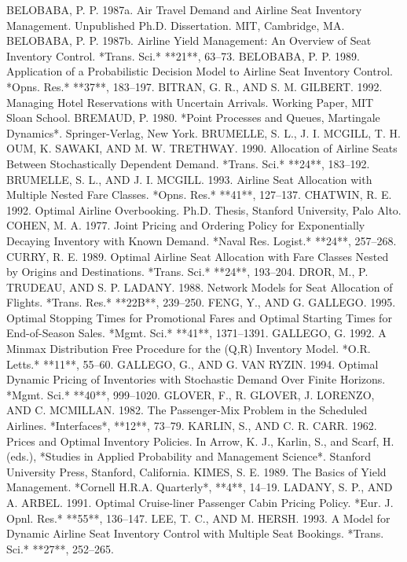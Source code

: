 BELOBABA, P. P. 1987a. Air Travel Demand and Airline Seat Inventory Management. Unpublished Ph.D. Dissertation. MIT, Cambridge, MA.  
BELOBABA, P. P. 1987b. Airline Yield Management: An Overview of Seat Inventory Control. *Trans. Sci.* **21**, 63–73.  
BELOBABA, P. P. 1989. Application of a Probabilistic Decision Model to Airline Seat Inventory Control. *Opns. Res.* **37**, 183–197.  
BITRAN, G. R., AND S. M. GILBERT. 1992. Managing Hotel Reservations with Uncertain Arrivals. Working Paper, MIT Sloan School.  
BREMAUD, P. 1980. *Point Processes and Queues, Martingale Dynamics*. Springer-Verlag, New York.  
BRUMELLE, S. L., J. I. MCGILL, T. H. OUM, K. SAWAKI, AND M. W. TRETHWAY. 1990. Allocation of Airline Seats Between Stochastically Dependent Demand. *Trans. Sci.* **24**, 183–192.  
BRUMELLE, S. L., AND J. I. MCGILL. 1993. Airline Seat Allocation with Multiple Nested Fare Classes. *Opns. Res.* **41**, 127–137.  
CHATWIN, R. E. 1992. Optimal Airline Overbooking. Ph.D. Thesis, Stanford University, Palo Alto.  
COHEN, M. A. 1977. Joint Pricing and Ordering Policy for Exponentially Decaying Inventory with Known Demand. *Naval Res. Logist.* **24**, 257–268.  
CURRY, R. E. 1989. Optimal Airline Seat Allocation with Fare Classes Nested by Origins and Destinations. *Trans. Sci.* **24**, 193–204.  
DROR, M., P. TRUDEAU, AND S. P. LADANY. 1988. Network Models for Seat Allocation of Flights. *Trans. Res.* **22B**, 239–250.  
FENG, Y., AND G. GALLEGO. 1995. Optimal Stopping Times for Promotional Fares and Optimal Starting Times for End-of-Season Sales. *Mgmt. Sci.* **41**, 1371–1391.  
GALLEGO, G. 1992. A Minmax Distribution Free Procedure for the (Q,R) Inventory Model. *O.R. Letts.* **11**, 55–60.  
GALLEGO, G., AND G. VAN RYZIN. 1994. Optimal Dynamic Pricing of Inventories with Stochastic Demand Over Finite Horizons. *Mgmt. Sci.* **40**, 999–1020.  
GLOVER, F., R. GLOVER, J. LORENZO, AND C. MCMILLAN. 1982. The Passenger-Mix Problem in the Scheduled Airlines. *Interfaces*, **12**, 73–79.  
KARLIN, S., AND C. R. CARR. 1962. Prices and Optimal Inventory Policies. In Arrow, K. J., Karlin, S., and Scarf, H. (eds.), *Studies in Applied Probability and Management Science*. Stanford University Press, Stanford, California.  
KIMES, S. E. 1989. The Basics of Yield Management. *Cornell H.R.A. Quarterly*, **4**, 14–19.  
LADANY, S. P., AND A. ARBEL. 1991. Optimal Cruise-liner Passenger Cabin Pricing Policy. *Eur. J. Opnl. Res.* **55**, 136–147.  
LEE, T. C., AND M. HERSH. 1993. A Model for Dynamic Airline Seat Inventory Control with Multiple Seat Bookings. *Trans. Sci.* **27**, 252–265.  
